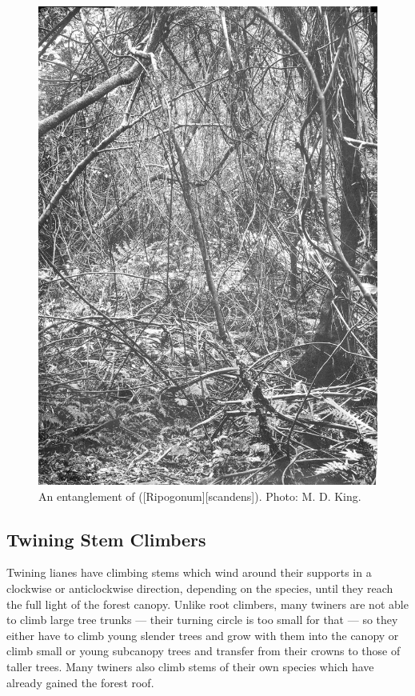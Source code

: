 \begin{figure}[htb]
\begin{minipage}[t]{0.478\textwidth}
    	\includegraphics[width=\textwidth]{graphics/figure33supplejack.jpg}
    	\caption[An entanglement of supplejack]{An entanglement of  ([Ripogonum][scandens]). Photo:  M. D. King.}%
    	\label{fig:33supplejack}
	\end{minipage}
\end{figure}

\subsection{Twining Stem Climbers}

Twining lianes have climbing stems which wind around their supports in a clockwise or anticlockwise direction, depending on the species, until they reach the full light of the forest canopy.
Unlike root climbers, many twiners are not able to climb large tree trunks --- their turning circle is too small for that --- so they either have to climb young slender trees and grow with them into the canopy or climb small or young subcanopy trees and transfer from their crowns to those of taller trees.
Many twiners also climb stems of their own species which have already gained the forest roof.

